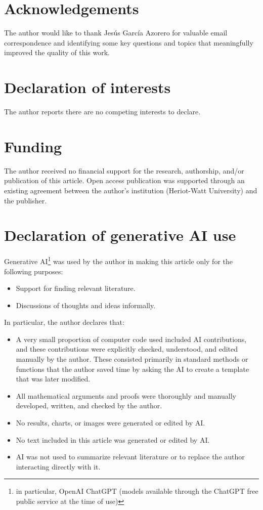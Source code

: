 \documentclass[12pt,a4paper]{article}
\begin{document}
\section*{Acknowledgements}

The author would like to thank Jesús García Azorero for valuable email correspondence and identifying some key questions and topics that meaningfully improved the quality of this work.

\section*{Declaration of interests}

The author reports there are no competing interests to declare.

\section*{Funding}

The author received no financial support for the research, authorship, and/or publication of this article. Open access publication was supported through an existing agreement between the author's institution (Heriot-Watt University) and the publisher.

\section*{Declaration of generative AI use}

Generative AI\footnote{in particular, OpenAI ChatGPT (models available through the ChatGPT free public service at the time of use)} was used by the author in making this article only for the following purposes:

\begin{itemize}
\item Support for finding relevant literature.
\item Discussions of thoughts and ideas informally.
\end{itemize}

In particular, the author declares that:

\begin{itemize}
\item A very small proportion of computer code used included AI contributions, and these contributions were explicitly checked, understood, and edited manually by the author. These consisted primarily in standard methods or functions that the author saved time by asking the AI to create a template that was later modified.
\item All mathematical arguments and proofs were thoroughly and manually developed, written, and checked by the author.
\item No results, charts, or images were generated or edited by AI.
\item No text included in this article was generated or edited by AI.
\item AI was not used to summarize relevant literature or to replace the author interacting directly with it.
\end{itemize}
\end{document}
